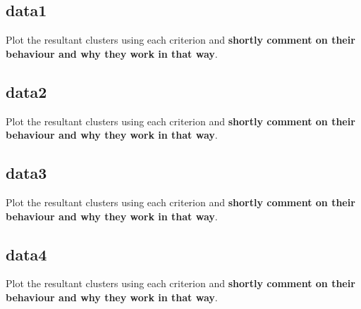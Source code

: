 \documentclass{article}
\begin{document}
\subsection{data1}
Plot the resultant clusters using each criterion and \textbf{shortly comment on their behaviour and why they work in that way}.\\
\subsection{data2}
Plot the resultant clusters using each criterion and \textbf{shortly comment on their behaviour and why they work in that way}.\\
\subsection{data3}
Plot the resultant clusters using each criterion and \textbf{shortly comment on their behaviour and why they work in that way}.\\
\subsection{data4}
Plot the resultant clusters using each criterion and \textbf{shortly comment on their behaviour and why they work in that way}.\\
\end{document}
